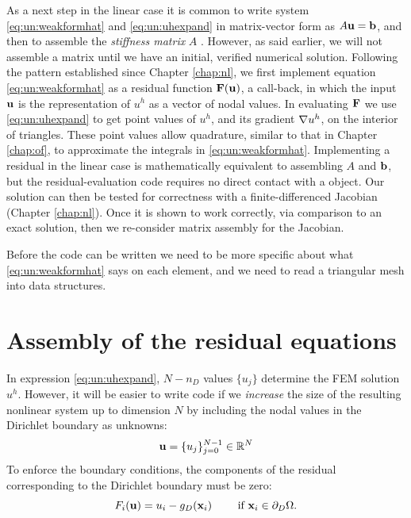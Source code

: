 As a next step in the linear case it is common to write system \eqref{eq:un:weakformhat} and \eqref{eq:un:uhexpand} in matrix-vector form as $A \mathbf{u} = \mathbf{b}$, and then to assemble the \emph{stiffness matrix} $A$ \citep{Elmanetal2005}.  However, as said earlier, we will not assemble a matrix until we have an initial, verified numerical solution.  Following the pattern established since Chapter \ref{chap:nl}, we first implement equation \eqref{eq:un:weakformhat} as a residual function $\mathbf{F}(\mathbf{u})$, a \PETSc \pSNES call-back, in which the input $\mathbf{u}$ is the representation of $u^h$ as a vector of nodal values.  In evaluating $\mathbf{F}$ we use \eqref{eq:un:uhexpand} to get point values of $u^h$, and its gradient $\nabla u^h$, on the interior of triangles.  These point values allow quadrature, similar to that in Chapter \ref{chap:of}, to approximate the integrals in \eqref{eq:un:weakformhat}.  Implementing a residual in the linear case is mathematically equivalent to assembling $A$ and $\mathbf{b}$, but the residual-evaluation code requires no direct contact with a \PETSc \pMat object.  Our solution can then be tested for correctness with a finite-differenced Jacobian (Chapter \ref{chap:nl}).  Once it is shown to work correctly, via comparison to an exact solution, then we re-consider matrix assembly for the Jacobian.

Before the code can be written we need to be more specific about what \eqref{eq:un:weakformhat} says on each element, and we need to read a triangular mesh into \PETSc data structures.


\section{Assembly of the residual equations}

In expression \eqref{eq:un:uhexpand}, $N-n_D$ values $\{u_j\}$ determine the FEM solution $u^h$.  However, it will be easier to write code if we \emph{increase} the size of the resulting nonlinear system up to dimension $N$ by including the nodal values in the Dirichlet boundary as unknowns:
\begin{equation}
\mathbf{u} = \{u_j\}_{j=0}^{N-1} \in \mathbb{R}^N  \label{eq:un:unknowns}
\end{equation}
To enforce the boundary conditions, the components of the residual corresponding to the Dirichlet boundary must be zero:
\begin{equation}
F_i(\mathbf{u}) = u_i - g_D(\mathbf{x}_i) \qquad \text{ if } \mathbf{x}_i \in \partial_D\Omega.  \label{eq:un:dirichletresiduals}
\end{equation}

